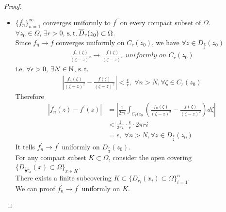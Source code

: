 \begin{thm}
\begin{proof}
\begin{enumerate}
\begin{itemize}
					\item $\{ f_{n}^{'} \}_{n = 1}^{\infty}$ converges uniformly to $f^{'}$ on every compact subset of $\Omega$. \\
					$\forall z_0 \in \Omega$, $\exists r > 0$, $\operatorname{s.t.} \overline{D}_{r}(z_0) \subset \Omega$. \\
					Since $f_n \longrightarrow f$ converges uniformly on $C_{r}(z_0)$, we have $\forall z \in D_{\frac{r}{2}}(z_0)$
					\begin{align}
						\frac{f_{n}(\zeta)}{(\zeta - z)^2} \to \frac{f(\zeta)}{(\zeta - z)^2} \,\, uniformly \,\, on \,\, C_{r}(z_0)
					\end{align}
					i.e. $\forall \epsilon > 0$, $\exists N \in \mathbb{N}$, $\operatorname{s.t.}$
					\begin{align}
						\left| \frac{f_{n}(\zeta)}{(\zeta - z)^2} - \frac{f(\zeta)}{(\zeta - z)^2} \right| < \frac{\epsilon}{r}, \,\, \forall n > N , \forall \zeta \in C_{r}(z_0)
					\end{align}
					Therefore
					\begin{align}
						\left| f_{n}^{'}(z) - f^{'}(z) \right| 
						&= \left| \frac{1}{2\pi i} \int_{C_{r}(z_0}{\left( \frac{f_{n}(\zeta)}{(\zeta - z)^2} - \frac{f(\zeta)}{(\zeta - z)^2} \right) d\zeta} \right| \\
						&< \frac{1}{2 \pi i} \cdot \frac{\epsilon}{r} \cdot 2 \pi r i \\
						&= \epsilon , \,\, \forall n > N , \forall z \in D_{\frac{r}{2}}(z_0)
					\end{align}
					It tells $f_{n}^{'} \to f^{'}$ uniformly on $D_{\frac{r}{2}}(z_0)$. \\
					For any compact subset $K \subset \Omega$, consider the open covering $\{ D_{\frac{1}{2} r_x}(x) \subset \Omega \}_{x \in K}$.\\
					There exists a finite subcovering $K \subset \{ D_{r_i}(x_i) \subset \Omega \}_{i = 1}^{n}$. \\
					We can proof $f_{n}^{'} \to f^{'}$ uniformly on $K$.
				\end{itemize}
			\end{enumerate}
		\end{proof}
	\end{thm}

\newpage

